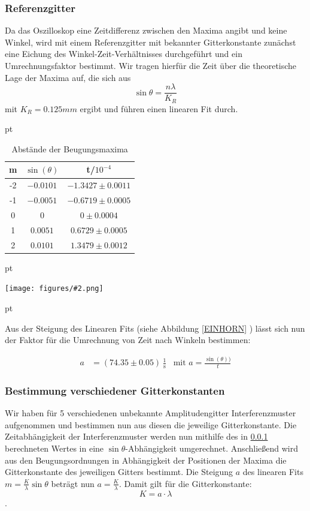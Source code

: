 \documentclass[12pt]{article}
\newcommand{\gra}[3][0.7]{
	\begin{minipage}[h!]{\textwidth}
		\centering
		\texttt{[image: figures/\#2.png]}
		\captionof{figure}{#3}
	\end{minipage}
	\vskip 30 pt
}
\begin{document}
\subsubsection{Referenzgitter}

\label{Happyisttoll}

Da das Oszilloskop eine Zeitdifferenz zwischen den Maxima angibt und keine Winkel, wird mit einem Referenzgitter mit bekannter Gitterkonstante zunächst eine Eichung des Winkel-Zeit-Verhältnisses durchgeführt und ein Umrechnungsfaktor bestimmt. Wir tragen hierfür die Zeit über die theoretische Lage der Maxima auf, die sich aus \[\sin\theta=\frac{n\lambda}{K_R}\] mit $K_R = 0.125 mm$ ergibt und führen einen linearen Fit durch.

 pt
 \begin{table}[h!]
 {\centering{}
\begin{tabular}{c||c|c}
 m & $\sin(\theta)$ & t/$10^{-4}$ \\ \hline\hline
 -2 &$-0.0101$&    $ -1.3427 \pm 0.0011 $  \\ \hline
 -1 &$-0.0051$& $ -0.6719 \pm 0.0005 $     \\ \hline
 0 &$0$&  $ 0\pm 0.0004$         \\ \hline
 1 &$0.0051$&   $ 0.6729 \pm 0.0005 $        \\ \hline
 2 &$0.0101$&     $ 1.3479 \pm 0.0012 $        \\ \hline

 \end{tabular}
 
 \caption{Abstände der Beugungsmaxima}}
\end{table}
 pt

\gra{Zeiteichung}{Zeit-Winkel-Eichung\label{EINHORN}}

Aus der Steigung des Linearen Fits (siehe Abbildung \ref{EINHORN} ) lässt sich nun der Faktor für die Umrechnung von Zeit nach Winkeln bestimmen:

\begin{align*}
a &= (74.35\pm0.05)\,\frac1{\mathrm{s}}&
\text{mit } a = \frac{\sin(\theta))}{t}
\end{align*}

\subsubsection{Bestimmung verschiedener Gitterkonstanten}
Wir haben für 5 verschiedenen unbekannte Amplitudengitter Interferenzmuster aufgenommen und bestimmen nun aus diesen die jeweilige Gitterkonstante. Die Zeitabhängigkeit der Interferenzmuster werden nun mithilfe des in \ref{Happyisttoll} berechneten Wertes in eine $\sin\theta$-Abhängigkeit umgerechnet. Anschließend wird aus den Beugungsordnungen in Abhängigkeit der Positionen der Maxima die Gitterkonstante des jeweiligen Gitters bestimmt. Die Steigung $a$ des linearen Fits $m=\frac{K}{\lambda}\sin\theta$ beträgt nun $a=\frac{K}{\lambda}$. Damit gilt für die Gitterkonstante: $$K=a\cdot\lambda$$.
\end{document}
